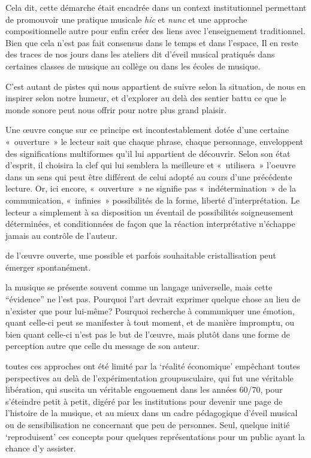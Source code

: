 Cela dit, cette démarche était encadrée dans un context institutionnel permettant de promouvoir une pratique musicale \textit{hic}  et \textit{nunc} et une approche compositionnelle autre pour enfin créer des liens avec l'enseignement traditionnel. Bien que cela n'est pas fait consensus dans le temps et dans l'espace, Il en reste des traces de nos jours dans les ateliers dit d'éveil musical pratiqués dans certaines classes de musique au collège ou dans les écoles de musique. 




C’est autant de pistes qui nous appartient de suivre selon la situation, de nous en inspirer selon notre humeur, et d’explorer au delà des sentier battu ce que le monde sonore peut nous offrir pour notre plus grand plaisir. 

Une œuvre conçue sur ce principe est incontestablement dotée d'une certaine « ouverture » le lecteur sait que chaque phrase, chaque personnage, enveloppent des significations multiformes qu'il lui appartient de découvrir. Selon son état d'esprit, il choisira la clef qui lui semblera la meilleure et « utilisera » l'oeuvre dans un sens qui peut être différent de celui adopté au cours d'une précédente lecture. Or, ici encore, « ouverture » ne signifie pas « indétermination » de la communication, « infinies » possibilités de la forme, liberté d'interprétation. Le lecteur a simplement à sa disposition un éventail de possibilités soigneusement déterminées, et conditionnées de façon que la réaction interprétative n'échappe jamais au contrôle de l'auteur.


de l’œuvre ouverte, une possible et parfois souhaitable cristallisation peut émerger spontanément.

la musique se présente souvent comme un langage universelle, mais cette “évidence” ne l’est pas. Pourquoi l’art devrait exprimer quelque chose au lieu de n’exister que pour lui-même? Pourquoi recherche à communiquer une émotion, quant celle-ci peut se manifester à tout moment, et de manière impromptu, ou bien quant celle-ci n’est pas le but de l’œuvre, mais plutôt dans une forme de perception autre que celle du message de son auteur. 



toutes ces approches ont été limité par la `réalité économique’ empêchant toutes perspectives au delà de l’expérimentation groupusculaire, qui fut une véritable libération, qui suscita un véritable engouement dans les années 60/70, pour s’éteindre petit à petit, digéré par les institutions pour devenir une page de l’histoire de la musique, et au mieux dans un cadre pédagogique d’éveil musical ou de sensibilisation ne concernant que peu de personnes. Seul, quelque initié `reproduisent’ ces concepts pour quelques représentations pour un public ayant la chance d’y assister. 

